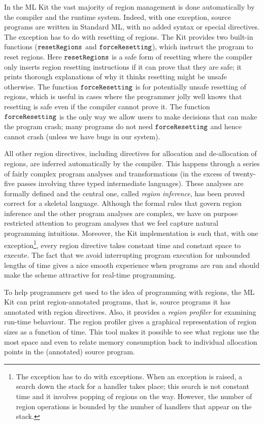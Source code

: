\documentclass[12pt]{book}
\begin{document}
In the ML Kit the vast majority of region management is done
automatically by the compiler and the runtime system.  Indeed, with
one exception, source programs are written in Standard ML, with no
added syntax or special directives. The exception has to do with
resetting of regions. The Kit provides two built-in functions
%
%
($\hbox{\tt resetRegions}$ and $\hbox{\tt forceResetting}$), which instruct the program to reset
regions. Here $\hbox{\tt resetRegions}$ is a safe form of resetting where the compiler
only inserts region resetting instructions if it can prove that they
are safe; it prints thorough explanations of why it thinks resetting
might be unsafe otherwise. The function $\hbox{\tt forceResetting}$ is for potentially
unsafe resetting of regions, which is useful in cases where the
programmer jolly well knows that resetting is safe even if the
compiler cannot prove it. The function $\hbox{\tt forceResetting}$ is the only way we
allow users to make decisions that can make the program crash; many
programs do not need $\hbox{\tt forceResetting}$ and hence cannot crash (unless we have
bugs in our system).

All other region directives, including directives for allocation and
de-allocation of regions, are inferred automatically by the compiler.
This happens through a series of fairly complex program analyses and
transformations (in the excess of twenty-five passes involving three
typed intermediate languages). These analyses are formally defined and
the central one, called
%
{\em region inference}, has been proved correct for a skeletal
language. Although the formal rules that govern region inference and
the other program analyses are complex, we have on purpose restricted
attention to program analyses that we feel capture natural programming
intuitions.  Moreover, the Kit implementation is such that, with one
exception\footnote{The exception has to do with exceptions. When an
  exception is raised, a search down the stack for a handler takes
  place; this search is not constant time and it involves popping of
  regions on the way. However, the number of region operations is
  bounded by the number of handlers that appear on the stack.}, every
region directive takes constant time and constant space to execute.
The fact that we avoid interrupting program execution for unbounded
lengths of time gives a nice smooth experience when programs are run
and should make the scheme attractive for real-time programming.

To help programmers get used to the idea of programming with regions,
the ML Kit can print region-annotated programs, that is, source programs
it has annotated with region directives. Also, it provides a 
%
{\em region profiler\/} for examining run-time behaviour.  The region
profiler gives a graphical representation of region sizes as a
function of time. This tool makes it possible to see what regions use
the most space and even to relate memory consumption back to
individual allocation points in the (annotated) source program.
\end{document}
